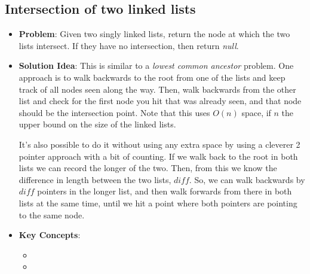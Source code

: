 \documentclass[10pt,a4paper]{article}
\begin{document}
\subsection*{Intersection of two linked lists}
\begin{itemize}
\item \textbf{Problem}: Given two singly linked lists, return the node at which the two lists intersect. If they have no intersection, then return \textit{null}.
\item \textbf{Solution Idea}: This is similar to a \textit{lowest common ancestor} problem. One approach is to walk backwards to the root from one of the lists and keep track of all nodes seen along the way. Then, walk backwards from the other list and check for the first node you hit that was already seen, and that node should be the intersection point. Note that this uses $O(n)$ space, if $n$ the upper bound on the size of the linked lists. 

It's also possible to do it without using any extra space by using a cleverer 2 pointer approach with a bit of counting. If we walk back to the root in both lists we can record the longer of the two. Then, from this we know the difference in length between the two lists, $diff$. So, we can walk backwards by $diff$ pointers in the longer list, and then walk forwards from there in both lists at the same time, until we hit a point where both pointers are pointing to the same node.
\item \textbf{Key Concepts}:
\begin{itemize}
    \item {}
    \item {}
\end{itemize}
\end{itemize}
\end{document}
